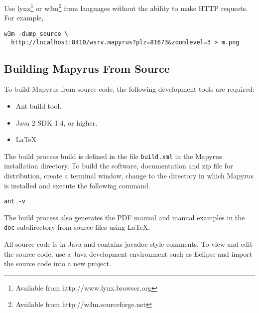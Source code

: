 Use lynx\footnote{Available from http://www.lynx.browser.org} or
w3m\footnote{Available from http://w3m.sourceforge.net}
from languages without the ability to make
HTTP requests.  For example,

\begin{verbatim}
w3m -dump_source \
  http://localhost:8410/wsrv.mapyrus?plz=81673&zoomlevel=3 > m.png
\end{verbatim}

\subsection{Building Mapyrus From Source}

To build Mapyrus from source code, the following development tools
are required:

\begin{itemize}
\item
Ant build tool.
\item
Java 2 SDK 1.4, or higher.
\item
\LaTeX
\end{itemize}

The build process build is defined in the file \texttt{build.xml} in the
Mapyrus installation directory.  To build the software, documentation and zip
file for distribution, create a terminal window, change to the directory in
which Mapyrus is installed and execute the following command.

\begin{verbatim}
ant -v
\end{verbatim}

The build process also generates the PDF manual and manual examples in the
\texttt{doc} subdirectory from source files using \LaTeX.

All source code is in Java and contains javadoc style comments.  To view and
edit the source code, use a Java development environment such as Eclipse and
import the source code into a new project.

